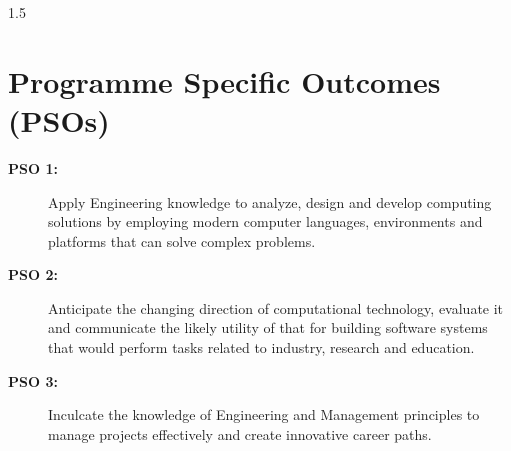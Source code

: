 \begin{spacing}{1.5}
\section*{Programme Specific Outcomes (PSOs)}
\begin{description}
    \item[\textbf{PSO 1:}] Apply Engineering knowledge to analyze, design and develop computing solutions by employing modern computer languages, environments and platforms that can solve complex problems.
    \item[\textbf{PSO 2:}] Anticipate the changing direction of computational technology, evaluate it and communicate the likely utility of that for building software systems that would perform tasks related to industry, research and education.
    \item[\textbf{PSO 3:}] Inculcate the knowledge of Engineering and Management principles to manage projects effectively and create innovative career paths.
\end{description}
\end{spacing}
